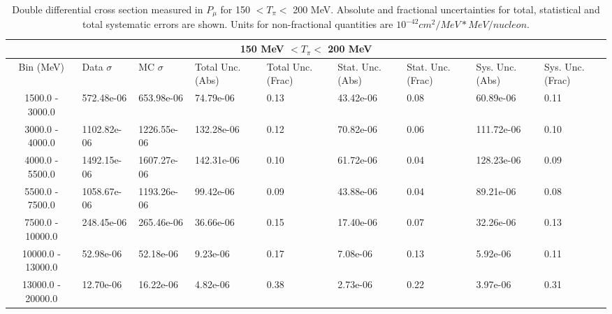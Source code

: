 \begin{table}[!htb]
    \centering
    \tiny
    \begin{tabular}{|c|p{0.5in}|p{0.5in}|p{0.5in}|p{0.5in}|p{0.5in}|p{0.5in}|p{0.5in}|p{0.5in}|}

        \hline
        \multicolumn{9}{c}{150 MeV $ < T_\pi < $ 200 MeV}\\
        \hline
        Bin (MeV)& Data $\sigma$ & MC $\sigma$ & Total Unc. (Abs) & Total Unc. (Frac)  & Stat. Unc. (Abs) & Stat. Unc. (Frac) & Sys. Unc. (Abs) & Sys. Unc. (Frac)\\ \hline
1500.0 - 3000.0 & 572.48e-06 & 653.98e-06 & 74.79e-06 & 0.13 & 43.42e-06 & 0.08 & 60.89e-06 & 0.11\\ \hline
3000.0 - 4000.0 & 1102.82e-06 & 1226.55e-06 & 132.28e-06 & 0.12 & 70.82e-06 & 0.06 & 111.72e-06 & 0.10\\ \hline
4000.0 - 5500.0 & 1492.15e-06 & 1607.27e-06 & 142.31e-06 & 0.10 & 61.72e-06 & 0.04 & 128.23e-06 & 0.09\\ \hline
5500.0 - 7500.0 & 1058.67e-06 & 1193.26e-06 & 99.42e-06 & 0.09 & 43.88e-06 & 0.04 & 89.21e-06 & 0.08\\ \hline
7500.0 - 10000.0 & 248.45e-06 & 265.46e-06 & 36.66e-06 & 0.15 & 17.40e-06 & 0.07 & 32.26e-06 & 0.13\\ \hline
10000.0 - 13000.0 & 52.98e-06 & 52.18e-06 & 9.23e-06 & 0.17 & 7.08e-06 & 0.13 & 5.92e-06 & 0.11\\ \hline
13000.0 - 20000.0 & 12.70e-06 & 16.22e-06 & 4.82e-06 & 0.38 & 2.73e-06 & 0.22 & 3.97e-06 & 0.31\\ \hline

    \end{tabular}
    \caption{Double differential cross section measured in $P_\mu$ for 150 $ < T_\pi < $ 200 MeV. Absolute and fractional uncertainties for total, statistical and total systematic errors are shown. Units for non-fractional quantities are $10^{-42}cm^2/MeV*MeV/nucleon$.}
    \label{tab:ApdxA:XSecTable2Dpmutpi4}
\end{table}

